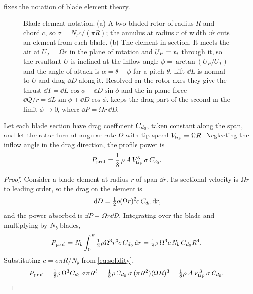  fixes the notation of blade element theory.

\begin{figure}[tbp]
\centering

\caption{Blade element notation. (a) A two-bladed rotor of radius $R$ and chord
$c$, so $\sigma = N_bc/(\pi R)$; the annulus at radius $r$ of width $\dd r$
cuts an element from each blade. (b) The element in section. It meets the air
at $U_T = \Omega r$ in the plane of rotation and $U_P = v_i$ through it, so
the resultant $U$ is inclined at the inflow angle $\phi = \arctan(U_P/U_T)$
and the angle of attack is $\alpha = \theta - \phi$ for a pitch $\theta$. Lift
$\dd L$ is normal to $U$ and drag $\dd D$ along it. Resolved on the rotor axes
they give the thrust $\dd T = \dd L\cos\phi - \dd D\sin\phi$ and the in-plane
force $\dd Q/r = \dd L\sin\phi + \dd D\cos\phi$.  keeps
the drag part of the second in the limit $\phi\to0$, where
$\dd P = \Omega r\,\dd D$.}
\label{fig:element}
\end{figure}

\begin{proposition}
\label{prop:profile}
Let each blade section have drag coefficient $C_{d_0}$, taken constant along the
span, and let the rotor turn at angular rate $\Omega$ with tip speed
$V_{\mathrm{tip}} = \Omega R$. Neglecting the inflow angle in the drag direction, the
profile power is
\begin{equation}
  P_{\mathrm{prof}} = \frac{1}{8}\,\rho\, A\, V_{\mathrm{tip}}^{3}\, \sigma\, C_{d_0} .
  \label{eq:profile}
\end{equation}
\end{proposition}

\begin{proof}
Consider a blade element at radius $r$ of span $\dd r$. Its sectional velocity
is $\Omega r$ to leading order, so the drag on the element is
\[
  \,\mathrm{d} D = \tfrac12 \rho (\Omega r)^2 c\, C_{d_0} \,\mathrm{d} r ,
\]
and the power absorbed is $\dd P = \Omega r \dd D$. Integrating over the blade
and multiplying by $N_b$ blades,
\[
  P_{\mathrm{prof}} = N_b \int_0^R \tfrac12 \rho \Omega^3 r^3 c\,C_{d_0} \,\mathrm{d} r
         = \tfrac{1}{8}\rho\,\Omega^3 c\, N_b\, C_{d_0} R^4 .
\]
Substituting $c = \sigma \pi R/N_b$ from \cref{eq:solidity},
\[
  P_{\mathrm{prof}} = \tfrac{1}{8}\rho\,\Omega^3 C_{d_0} \,\sigma \pi R^{5}
         = \tfrac{1}{8}\rho\, C_{d_0}\, \sigma\, (\pi R^2)(\Omega R)^3
         = \tfrac{1}{8}\rho\, A\, V_{\mathrm{tip}}^3\, \sigma\, C_{d_0} . \qedhere
\]
\end{proof}

